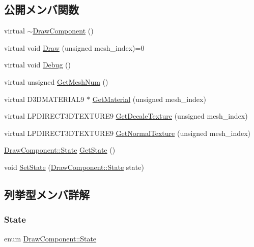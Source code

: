 \subsection*{公開メンバ関数}
\begin{DoxyCompactItemize}
\item 
virtual \mbox{\hyperlink{class_draw_component_a028c5084fd306431f3e229650af54ad1}{$\sim$\+Draw\+Component}} ()
\item 
virtual void \mbox{\hyperlink{class_draw_component_ae84bfb6ccc2fda9e54cdff45057ea2c3}{Draw}} (unsigned mesh\+\_\+index)=0
\item 
virtual void \mbox{\hyperlink{class_draw_component_a9d66e27ebe55d9cf4af70c03b391193d}{Debug}} ()
\item 
virtual unsigned \mbox{\hyperlink{class_draw_component_a5f3bbcc8e563b740c0a5535170921c75}{Get\+Mesh\+Num}} ()
\item 
virtual D3\+D\+M\+A\+T\+E\+R\+I\+A\+L9 $\ast$ \mbox{\hyperlink{class_draw_component_adae078d5139f691997763bf6cac9e25a}{Get\+Material}} (unsigned mesh\+\_\+index)
\item 
virtual L\+P\+D\+I\+R\+E\+C\+T3\+D\+T\+E\+X\+T\+U\+R\+E9 \mbox{\hyperlink{class_draw_component_a9ea98f4bcdfd76782d5234122b132c3d}{Get\+Decale\+Texture}} (unsigned mesh\+\_\+index)
\item 
virtual L\+P\+D\+I\+R\+E\+C\+T3\+D\+T\+E\+X\+T\+U\+R\+E9 \mbox{\hyperlink{class_draw_component_a03b739c28b9abcff3a3e5bda6bcc2060}{Get\+Normal\+Texture}} (unsigned mesh\+\_\+index)
\item 
\mbox{\hyperlink{class_draw_component_adde17e0eff392abede5f59463cc54032}{Draw\+Component\+::\+State}} \mbox{\hyperlink{class_draw_component_a5e4b82b07bda97a67ef6aeb5ba5b4b16}{Get\+State}} ()
\item 
void \mbox{\hyperlink{class_draw_component_a9f415e9e80142c6a8a0a399dd41febc8}{Set\+State}} (\mbox{\hyperlink{class_draw_component_adde17e0eff392abede5f59463cc54032}{Draw\+Component\+::\+State}} state)
\end{DoxyCompactItemize}


\subsection{列挙型メンバ詳解}
\mbox{\label{class_draw_component_adde17e0eff392abede5f59463cc54032}} 
\subsubsection{\texorpdfstring{State}{State}}
{\footnotesize\ttfamily enum \mbox{\hyperlink{class_draw_component_adde17e0eff392abede5f59463cc54032}{Draw\+Component\+::\+State}}}

